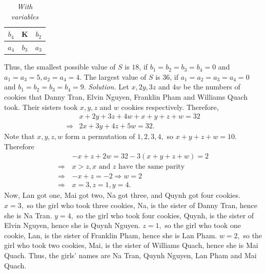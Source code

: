 \begin{multicols}{2}
\begin{table}[H]
\begin{tabular}{|c|c|c|}
			$b_4$ & K & $b_2$ \\ \hline
			$a_4$ & $b_3$ & $a_3$ \\ \hline
		\end{tabular}
		\caption{\small\textit{\color{toancuabi}With variables}}
		\vspace*{-10pt}
	\end{table}
	Thus, the smallest possible value of $S$ is $18$, if $b_1=b_2=b_3=b_4=0$ and $a_1=a_3=5,a_2=a_4=4.$
	The largest value of $S$ is $36$, if $a_1=a_2=a_3=a_4=0$ and $b_1=b_2=b_3=b_4=9.$
	\vskip 0.2cm
	\vskip 0.2cm
	\textit{Solution.}
	Let $x, 2y, 3z$ and $4w$ be the numbers of cookies that 
	Danny Tran, Elvin Nguyen, Franklin Pham and Williams Quach took.
	Their sisters took $x, y, z$ and $w$ cookies respectively. Therefore,
	\begin{align*}
		&x + 2y + 3z + 4w + x + y + z + w = 32\\
		\Rightarrow &2x + 3y + 4z + 5w = 32.
	\end{align*}
	Note that $x, y, z, w$ form a permutation of $1,2,3,4,$ so $x + y + z + w = 10.$
	Therefore
	\begin{align*}
		&-x + z + 2w \!=\! 32-3(x + y + z + w) \!=\! 2 \\
		\Rightarrow \,&x > z, x \text{\ and\ } z \text{\ have the same parity}\\
		\Rightarrow\,&-x+z=-2 \Rightarrow  w=2 \\
		\Rightarrow \,&x=3, z=1, y=4. 
	\end{align*}
	Now, Lan got one, Mai got two, Na got three, and Quynh got four cookies.
	\vskip 0.1cm
	$x=3,$ so the girl who took three cookies, Na, is the sister of Danny Tran, hence she is Na Tran.
	\vskip 0.1cm
	$y=4,$ so the girl who took four cookies, Quynh, is the sister of Elvin Nguyen, hence she is Quynh Nguyen.
	\vskip 0.1cm
	$z=1,$ so the girl who took one cookie, Lan, is the sister of Franklin Pham, hence she is Lan Pham.
	\vskip 0.1cm
	$w=2,$ so the girl who took two cookies, Mai, is the sister of Williams Quach, hence she is Mai Quach.
	\vskip 0.1cm
	Thus, the girls' names are Na Tran, Quynh Nguyen, Lan Pham and Mai Quach.
\end{multicols}
